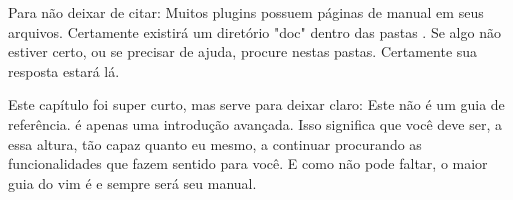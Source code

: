 Para não deixar de citar:
Muitos plugins possuem páginas de manual em seus arquivos.
Certamente existirá um diretório "doc" dentro das pastas .
Se algo não estiver certo, ou se precisar de ajuda, procure nestas pastas.
Certamente sua resposta estará lá.

Este capítulo foi super curto, mas serve para deixar claro:
Este não é um guia de referência. é apenas uma introdução avançada.
Isso significa que você deve ser, a essa altura, tão capaz quanto eu mesmo,
a continuar procurando as funcionalidades que fazem sentido para você.
E como não pode faltar, o maior guia do vim é e sempre será seu manual.

\newpage
